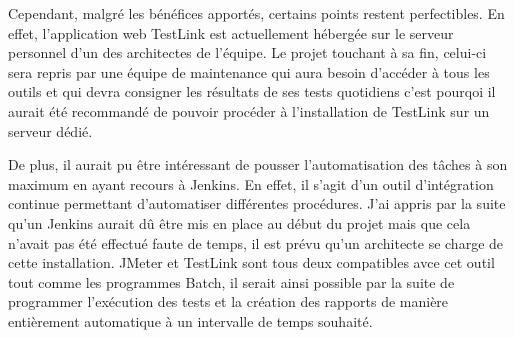 	Cependant, malgré les bénéfices apportés, certains points restent perfectibles. En effet, l'application web TestLink est actuellement hébergée sur le serveur personnel d'un des architectes de l'équipe. Le projet touchant à sa fin, celui-ci sera repris par une équipe de maintenance qui aura besoin d'accéder à tous les outils et qui devra consigner les résultats de ses tests quotidiens c'est pourqoi il aurait été recommandé de pouvoir procéder à l'installation de TestLink sur un serveur dédié. 
	
	De plus, il aurait pu être intéressant de pousser l'automatisation des tâches à son maximum en ayant recours à Jenkins. En effet, il s'agit d'un outil d'intégration continue permettant d'automatiser différentes procédures. J'ai appris par la suite qu'un Jenkins aurait dû être mis en place au début du projet mais que cela n'avait pas été effectué faute de temps, il est prévu qu'un architecte se charge de cette installation. JMeter et TestLink sont tous deux compatibles avce cet outil tout comme les programmes Batch, il serait ainsi possible par la suite de programmer l'exécution des tests et la création des rapports de manière entièrement automatique à un intervalle de temps souhaité.